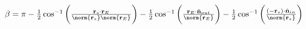 \documentclass[crop=false,class=article,oneside]{standalone}
\begin{document}
        \begin{theorem}
            $\beta%
             =\pi-\frac{1}{2}\cos^{-1}%
              \bigg(%
                  \frac{\mathbf{r}_{s}\cdot \mathbf{r}_{E}}
                  {%
                    \norm{\mathbf{r}_{s}}%
                    \norm{\mathbf{r}_{E}}%
                  }%
              \bigg)%
             -\frac{1}{2}\cos^{-1}%
              \bigg(%
                  \frac{%
                      \mathbf{r}_{E}\cdot%
                      \hat{\mathbf{n}}_{out}%
                  }{\norm{\mathbf{r}_{E}}}%
              \bigg)%
              -\frac{1}{2}\cos^{-1}\bigg(%
                  \frac{%
                      (-\mathbf{r}_{s})\cdot%
                      \hat{\mathbf{n}}_{in}%
                  }{\norm{\mathbf{r}_{s}}}%
              \bigg)$
        \end{theorem}
\end{document}
